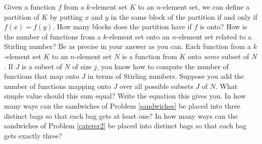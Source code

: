 \itemm Given a function $f$ from a $k$-element set $K$ to an $n$-element
set, we can define a partition of $K$ by putting $x$ and $y$ in the same
block of the partition if and only if $f(x)=f(y)$.  How many blocks does
the partition have if $f$ is onto?  How is the number of functions from a
$k$-element set onto an $n$-element set related to a Stirling number?   Be
as precise in your answer as you can.
\iteme Each function from a $k$-element set $K$ to an $n$-element set $N$
is a function from $K$ onto {\em some} subset of $N$.  If $J$ is a subset
of $N$ of size $j$, you know how to compute the number of functions that
map onto $J$ in terms of Stirling numbers.  Suppose you add the number of
functions mapping onto $J$ over all possible subsets $J$ of $N$.  What
simple value should this sum equal?  Write  the equation this gives
you.\label{Stirlingfalling}
\itemm In how many ways can the sandwiches of Problem \ref{sandwiches} be
placed into three distinct bags so that each bag gets at least one?
\itemm In how many ways can the sandwiches of Problem \ref{caterer2} be
placed into distinct bags so that each bag gets exactly three?

